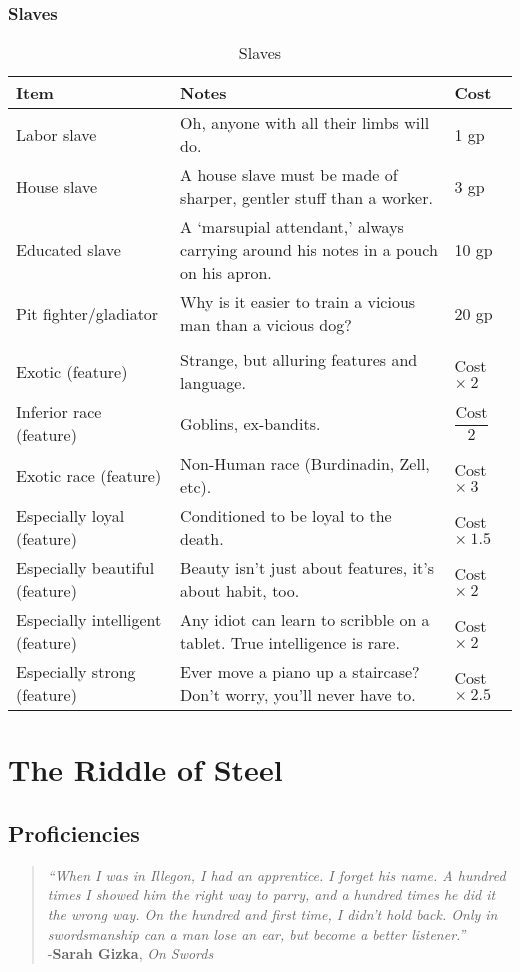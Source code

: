 \documentclass[oneside,11pt,english]{book}
\begin{document}
\section{Slaves}
\begin{table}[hb]
	\centering
	\caption{Slaves}
	\label{tab:Slaves}
	\begin{tabu} spread 0pt {*{3}{X[-1]}}
		Item &Notes &Cost\\\toprule
Labor slave &Oh, anyone with all their limbs will do. &1 gp\\
House slave &A house slave must be made of sharper, gentler stuff than a worker. &3 gp\\
Educated slave &A ‘marsupial attendant,’ always carrying around his notes in a pouch on his apron. &10 gp\\
Pit fighter/gladiator &Why is it easier to train a vicious man than a vicious dog? &20 gp\\
	\\
Exotic (feature) &Strange, but alluring features and language. &Cost $\times\ 2 $\\
Inferior race (feature) &Goblins, ex-bandits. &$ \dfrac{\text{Cost}}{2} $\\
Exotic race (feature) &Non-Human race (Burdinadin, Zell, etc). &Cost $ \times\ 3$\\
Especially loyal (feature) &Conditioned to be loyal to the death. &Cost $ \times\ 1.5 $\\
Especially beautiful (feature) &Beauty isn’t just about features, it’s about habit, too. &Cost $ \times\ 2 $\\
Especially intelligent (feature) &Any idiot can learn to scribble on a tablet. True intelligence is rare. &Cost $ \times\ 2 $\\
Especially strong (feature) &Ever move a piano up a staircase? Don’t worry, you’ll never have to. &Cost $ \times\ 2.5 $\\
	\end{tabu}
\end{table}
\part{The Riddle of Steel}
\chapter{Proficiencies}\label{ch:proficiencies} 
\startcontents[chapters]
\clearpage
\begin{quote}
	\centering
\emph{“When I was in Illegon, I had an apprentice. I forget his name. A hundred times I showed him the right way to parry, and a hundred times he did it the wrong way. On the hundred and first time, I didn’t hold back. Only in swordsmanship can a man lose an ear, but become a better listener.”}\\
\hfill -\textbf{Sarah Gizka}, \textit{On Swords}
\end{quote}
\end{document}
